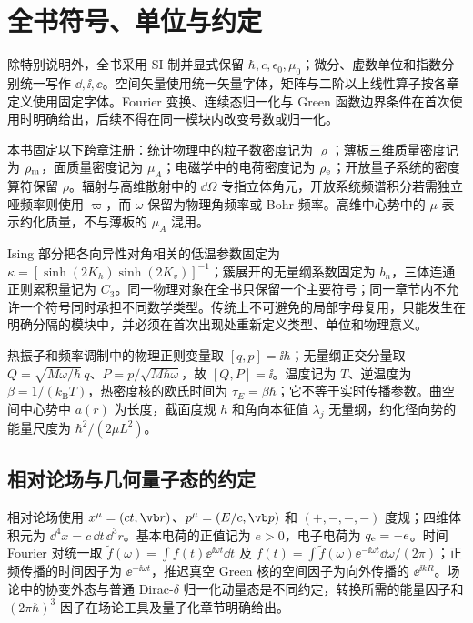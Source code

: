 \chapter*{全书符号、单位与约定}

除特别说明外，全书采用 SI 制并显式保留 $\hbar,c,\epsilon_0,\mu_0$；微分、虚数单位和指数分别统一写作 $\dd,\ii,\ee$。空间矢量使用统一矢量字体，矩阵与二阶以上线性算子按各章定义使用固定字体。Fourier 变换、连续态归一化与 Green 函数边界条件在首次使用时明确给出，后续不得在同一模块内改变号数或归一化。

本书固定以下跨章注册：统计物理中的粒子数密度记为 $\varrho$；薄板三维质量密度记为 $\rho_{\rm m}$，面质量密度记为 $\mu_A$；电磁学中的电荷密度记为 $\rho_{\rm e}$；开放量子系统的密度算符保留 $\rho$。辐射与高维散射中的 $\dd\Omega$ 专指立体角元，开放系统频谱积分若需独立哑频率则使用 $\varpi$，而 $\omega$ 保留为物理角频率或 Bohr 频率。高维中心势中的 $\mu$ 表示约化质量，不与薄板的 $\mu_A$ 混用。

Ising 部分把各向异性对角相关的低温参数固定为 $\kappa=[\sinh(2K_h)\sinh(2K_v)]^{-1}$；簇展开的无量纲系数固定为 $b_n$，三体连通正则累积量记为 $C_3$。同一物理对象在全书只保留一个主要符号；同一章节内不允许一个符号同时承担不同数学类型。传统上不可避免的局部字母复用，只能发生在明确分隔的模块中，并必须在首次出现处重新定义类型、单位和物理意义。

热振子和频率调制中的物理正则变量取 $[q,p]=\ii\hbar$；无量纲正交分量取 $Q=\sqrt{M\omega/\hbar}\,q$、$P=p/\sqrt{M\hbar\omega}$，故 $[Q,P]=\ii$。温度记为 $T$、逆温度为 $\beta=1/(k_{\mathrm B}T)$，热密度核的欧氏时间为 $\tau_E=\beta\hbar$；它不等于实时传播参数。曲空间中心势中 $a(r)$ 为长度，截面度规 $h$ 和角向本征值 $\lambda_j$ 无量纲，约化径向势的能量尺度为 $\hbar^2/(2\mu L^2)$。

\section*{相对论场与几何量子态的约定}

相对论场使用 $x^\mu=(ct,\vb r)$、$p^\mu=(E/c,\vb p)$ 和 $(+,-,-,-)$ 度规；四维体积元为 $\dd^4x=c\,\dd t\,\dd^3r$。基本电荷的正值记为 $e>0$，电子电荷为 $q_{\rm e}=-e$。时间 Fourier 对统一取 $\widetilde f(\omega)=\int f(t)\ee^{\ii\omega t}\dd t$ 及 $f(t)=\int\widetilde f(\omega)\ee^{-\ii\omega t}\dd\omega/(2\pi)$；正频传播的时间因子为 $\ee^{-\ii\omega t}$，推迟真空 Green 核的空间因子为向外传播的 $\ee^{\ii kR}$。场论中的协变外态与普通 Dirac-$\delta$ 归一化动量态是不同约定，转换所需的能量因子和 $(2\pi\hbar)^3$ 因子在场论工具及量子化章节明确给出。

